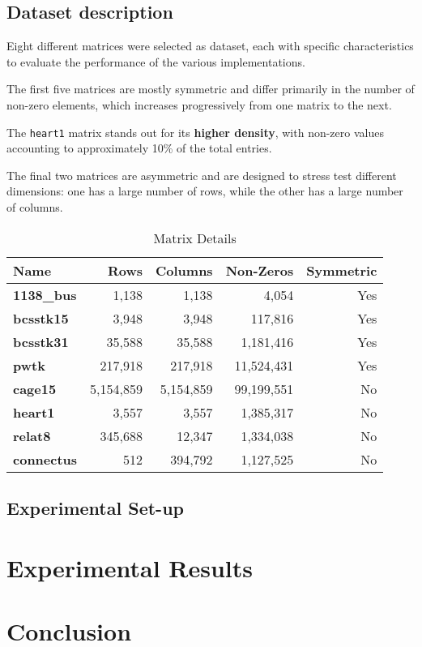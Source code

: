 \documentclass[conference]{IEEEtran}
\begin{document}
        \subsection{Dataset description}
        
        Eight different matrices were selected as dataset, each with specific
        characteristics to evaluate the performance of the various
        implementations.

        The first five matrices are mostly symmetric and differ primarily in
        the number of non-zero elements, which increases progressively from one
        matrix to the next.

        The \texttt{heart1} matrix stands out for its \textbf{higher density},
        with non-zero values accounting to approximately 10\% of the total
        entries.

        The final two matrices are asymmetric and are designed to stress test
        different dimensions: one has a large number of rows, while the other
        has a large number of columns.

        \begin{table}[ht]
            \caption{Matrix Details}
            \label{tab:matrix_details}
            \centering
            \begin{adjustbox}{width=\columnwidth}
            \begin{tabular}{lrrrr}
            \toprule
            \textbf{Name} & \textbf{Rows} & \textbf{Columns} & \textbf{Non-Zeros} & \textbf{Symmetric} \\
            \midrule
                \textbf{1138\_bus} & 1,138 & 1,138 & 4,054 & Yes \\
                \textbf{bcsstk15} & 3,948 & 3,948 & 117,816 & Yes \\
                \textbf{bcsstk31} & 35,588 & 35,588 & 1,181,416 & Yes \\
                \textbf{pwtk} & 217,918 & 217,918 & 11,524,431 & Yes \\
                \textbf{cage15} & 5,154,859 & 5,154,859 & 99,199,551 & No \\
                \textbf{heart1} & 3,557 & 3,557 & 1,385,317 & No \\
                \textbf{relat8} & 345,688 & 12,347 & 1,334,038 & No \\
                \textbf{connectus} & 512 & 394,792 & 1,127,525 & No \\
            \bottomrule
            \end{tabular}
            \end{adjustbox}
        \end{table}

        \subsection{Experimental Set-up}

    \section{Experimental Results}

    \section{Conclusion}

    
    
\end{document}
